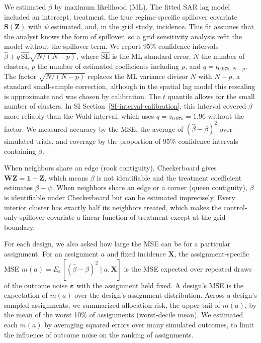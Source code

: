 \documentclass[Afour,sagev,times]{sagej}
\begin{document}
We estimated $\beta$ by maximum likelihood (ML).\cite{bivand_comparing_2015} The fitted SAR lag model included an intercept, treatment, the true regime-specific spillover covariate $\mathbf{S}(\mathbf{Z})$ with $\psi$ estimated, and, in the grid study, incidence. This fit assumes that the analyst knows the form of spillover, so a grid sensitivity analysis refit the model without the spillover term. We report 95\% confidence intervals $\hat\beta \pm q\,\widehat{\mathrm{SE}}\sqrt{N/(N-p)}$, where $\widehat{\mathrm{SE}}$ is the ML standard error, $N$ the number of clusters, $p$ the number of estimated coefficients including $\rho$, and $q = t_{0.975,\,N-p}$. The factor $\sqrt{N/(N-p)}$ replaces the ML variance divisor $N$ with $N-p$, a standard small-sample correction,\cite{mackinnon_heteroskedasticity_1985} although in the spatial lag model this rescaling is approximate and was chosen by calibration. The $t$ quantile allows for the small number of clusters.\cite{leyrat_cluster_2018} In SI Section~\ref{SI-interval-calibration}, this interval covered $\beta$ more reliably than the Wald interval,\cite{lee_asymptotic_2004} which uses $q = z_{0.975} = 1.96$ without the factor. We measured accuracy by the MSE, the average of $(\hat\beta-\beta)^2$ over simulated trials, and coverage by the proportion of 95\% confidence intervals containing $\beta$.

When neighbors share an edge (rook contiguity), Checkerboard gives $\mathbf{W}\mathbf{Z}=\mathbf{1}-\mathbf{Z}$, which means $\beta$ is not identifiable and the treatment coefficient estimates $\beta-\psi$. When neighbors share an edge or a corner (queen contiguity), $\beta$ is identifiable under Checkerboard but can be estimated imprecisely. Every interior cluster has exactly half its neighbors treated, which makes the control-only spillover covariate a linear function of treatment except at the grid boundary.

For each design, we also asked how large the MSE can be for a particular assignment. For an assignment $a$ and fixed incidence $\mathbf{X}$, the assignment-specific MSE $m(a)=E_{\boldsymbol{\varepsilon}}[(\hat\beta-\beta)^2\mid a,\mathbf{X}]$ is the MSE expected over repeated draws of the outcome noise $\boldsymbol{\varepsilon}$ with the assignment held fixed. A design's MSE is the expectation of $m(a)$ over the design's assignment distribution. Across a design's sampled assignments, we summarized allocation risk, the upper tail of $m(a)$, by the mean of the worst 10\% of assignments (worst-decile mean). We estimated each $m(a)$ by averaging squared errors over many simulated outcomes, to limit the influence of outcome noise on the ranking of assignments.
\end{document}
